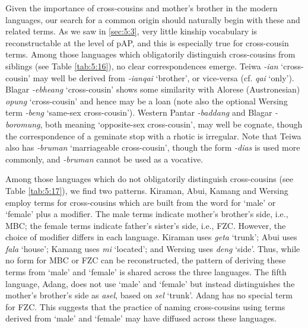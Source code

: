 Given the importance of cross-cousins and mother's brother in the modern languages, our search for a common origin should naturally begin with these and related terms. As we saw in {\SS} \ref{sec:5:3}, very little kinship vocabulary is reconstructable at the level of pAP, and this is especially true for cross-cousin terms. Among those languages which obligatorily distinguish cross-cousins from siblings (see Table \ref{tab:5:16}), no clear correspondences emerge. Teiwa \textit{-ian} `cross-cousin' may well be derived from \textit{-ianqai} `brother', or vice-versa (cf. \textit{qai} `only'). Blagar \textit{-ebheang} `cross-cousin' shows some similarity with Alorese (Austronesian) \textit{opung} `cross-cousin' and hence may be a loan (note also the optional Wersing term \textit{-beng} `same-sex cross-cousin'). Western Pantar \textit{-baddang} and Blagar \textit{-boromung}, both meaning `opposite-sex cross-cousin', may well be cognate, though the correspondence of a geminate stop with a rhotic is irregular. Note that Teiwa also has \textit{-bruman} `marriageable cross-cousin', though the form \textit{-dias} is used more commonly, and \textit{-bruman} cannot be used as a vocative.  

Among those languages which do not obligatorily distinguish cross-cousins (see Table \ref{tab:5:17}), we find two patterns. Kiraman, Abui, Kamang and Wersing employ terms for cross-cousins which are built from the word for `male' or `female' plus a modifier. The male terms indicate mother's brother's side, i.e., MBC; the female terms indicate father's sister's side, i.e., FZC. However, the choice of modifier differs in each language. Kiraman uses \textit{geta} `trunk'; Abui uses \textit{fala} `house'; Kamang uses \textit{mi} `located'; and Wersing uses \textit{deng} `side'. Thus, while no form for MBC or FZC can be reconstructed, the pattern of deriving these terms from `male' and `female' is shared across the three languages. The fifth language, Adang, does not use `male' and `female' but instead distinguishes the mother's brother's side as \textit{asel}, based on \textit{sel} `trunk'. Adang has no special term for FZC. This suggests that the practice of naming cross-cousins using terms derived from `male' and `female' may have diffused across these languages.

